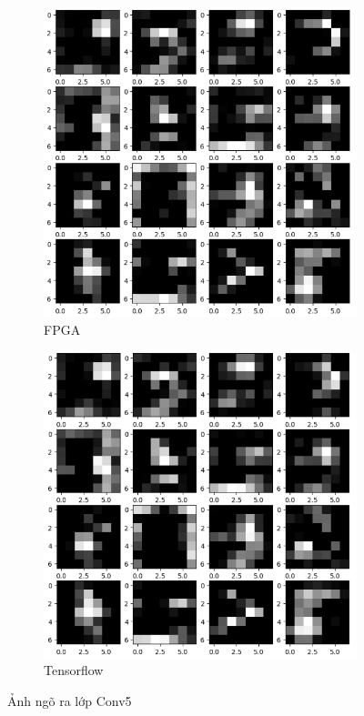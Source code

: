 \begin{figure}[H]
\centering
    \begin{subfigure}[b]{0.45\linewidth}
        \includegraphics[width=1\linewidth]{Images/fpgac5.png}
        \caption{FPGA}
        \label{fig:enter-label}
    \end{subfigure}
    \begin{subfigure}[b]{0.45\linewidth}
        \includegraphics[width=1\linewidth]{Images/cnnc5.png}
        \caption{Tensorflow}
        \label{fig:enter-label}
        \end{subfigure}
    \caption{Ảnh ngõ ra lớp Conv5}
    \label{fig:main}
\end{figure}

